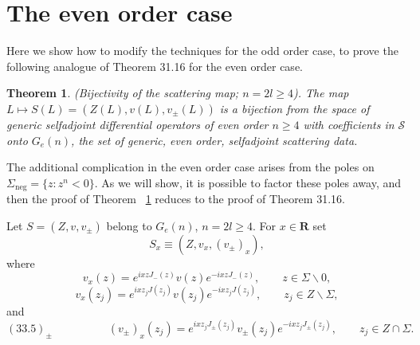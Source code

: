 \documentclass{surv-l}
\theoremstyle{plain}
\newtheorem{theorem}{Theorem}[section]
\theoremstyle{definition}
\numberwithin{equation}{chapter}
\begin{document}
\section{The even order case}\label{sec33}

Here we show how to modify the techniques for the odd order case, to prove the following analogue of Theorem 31.16 for the even order case.

\renewcommand\thetheorem{33.\arabic{theorem}}
\begin{theorem}\label{thm33.1}
\emph{(Bijectivity of the scattering map; $n=2l\geq 4$)}. The map $L\mapsto S(L)=(Z(L), v(L),v_{\pm}(L))$ is a bijection from the space of generic selfadjoint differential operators of even order $n\geq 4$ with coefficients in $\mathscr{S}$ onto $G_{e}(n)$, the set of generic, even order, selfadjoint scattering data.
\end{theorem}

The additional complication in the even order case arises from the poles on $\Sigma_{\mathrm{neg}}=\{z:z^{n}<0\}$. As we will show, it is possible to factor these poles away, and then the proof of Theorem ~\ref{thm33.1} reduces to the proof of Theorem 31.16.

Let $S= (Z, v, v_{\pm})$ belong to $G_{e}(n)$, $n=2l\geq 4$. For $x\in \mathbf{R}$ set
\setcounter{equation}{1}
\begin{equation}\label{eq33.2}
S_{x}\equiv(Z, v_{x}, (v_{\pm})_{x}),
\end{equation}
where
\begin{equation}\label{eq33.3}
v_{x}(z)=e^{ixzJ_{-}(z)}v(z)e^{-ixzJ_{-}(z)},\qquad z\in\Sigma\backslash 0,
\end{equation}
\begin{equation}\label{eq33.4}
v_{x}(z_{j})=e^{ixz_{j}J(z_{j})}v(z_{j})e^{-ixz_{j}J(z_{j})},\qquad  z_{j}\in Z\backslash \Sigma,
\end{equation}
and
\begin{equation*}
{(33.5)_{\pm}} \qquad \qquad \quad (v_{\pm})_{x}(z_{j})=e^{ixz_{j}J_{\pm}(z_{j})}v_{\pm}(z_{j})e^{-ixz_{j}J_{\pm}(z_{j})},  \qquad z_{j}\in Z\cap\Sigma.
\end{equation*}
\end{document}
